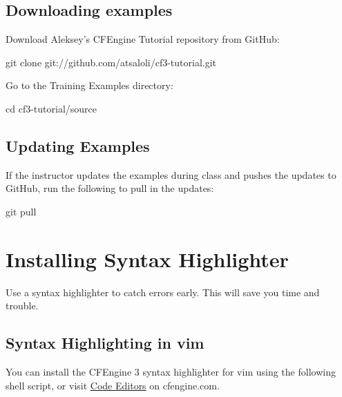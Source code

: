\subsection{Downloading examples}

Download Aleksey's CFEngine Tutorial repository from GitHub:

\begin{code}
git clone git://github.com/atsaloli/cf3-tutorial.git
\end{code}

Go to the Training Examples directory:

\begin{code}
cd cf3-tutorial/source
\end{code}





\subsection{Updating Examples}

If the instructor updates the examples during class and pushes the
updates to GitHub, run the following to pull in the updates:

\begin{code}
git pull
\end{code}





\section{Installing Syntax Highlighter}





Use a syntax highlighter to catch errors early. This will save you time and trouble.

\subsection{Syntax Highlighting in vim}

You can install the CFEngine 3 syntax highlighter for vim using the
following shell script, or visit \href{http://www.cfengine.com/cfengine-code-editors/}{Code Editors} on cfengine.com.





